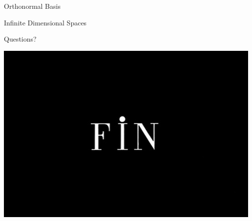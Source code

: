 \documentclass{beamer}
\begin{document}
\begin{frame}{Orthonormal Basis}
\end{frame}

\begin{frame}{Infinite Dimensional Spaces}
\end{frame}

\begin{frame}{Questions?}
	\begin{center}
		\includegraphics[width=.7\textwidth]{images/fin.png}
	\end{center}
\end{frame}
\end{document}
